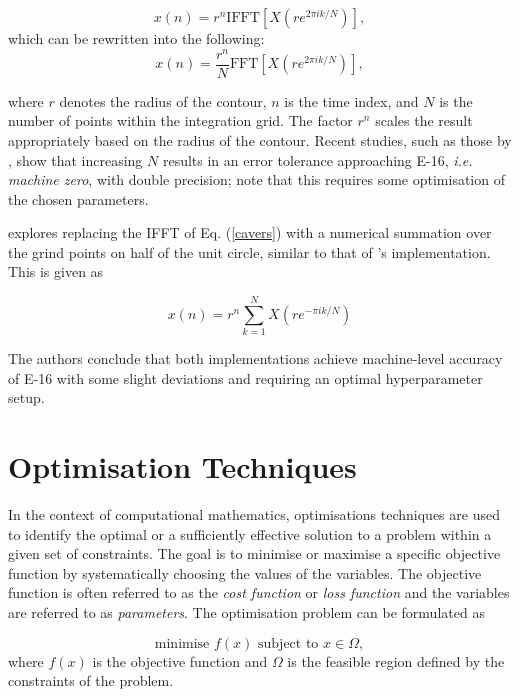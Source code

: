 \documentclass[a4paper]{report}
\begin{document}
\begin{equation}\label{cavers}
	x(n) = r^n \text{IFFT}[X(re^{2\pi ik / N})],
\end{equation}
which can be rewritten into the following:
\begin{equation}
		x(n) = \frac{r^n}{N} \text{FFT}[X(re^{2\pi ik / N})],
\end{equation}

where $r$ denotes the radius of the contour, $n$ is the time index, and $N$ is the number of points within the integration grid. The factor $r^n$ scales the result appropriately based on the radius of the contour. Recent studies, such as those by \citet{loveless2021guido}, show that increasing \(N\) results in an error tolerance approaching E-16, \textit{i.e. machine zero}, with double precision; note that this requires some optimisation of the chosen parameters. 

\citet{loveless2023phelanguido} explores replacing the IFFT of Eq. (\ref{cavers}) with a numerical summation over the grind points on half of the unit circle, similar to that of \citet{AbateWhitt1992a, AbateWhitt1992b}'s implementation. This is given as

\begin{equation}\label{equation:cavers_sum}
	x(n) = r^n \sum^{N}_{k = 1} X(re^{-\pi ik/N})
\end{equation}

The authors conclude that both implementations achieve machine-level accuracy of E-16 with some slight deviations and requiring an optimal hyperparameter setup.

\section{Optimisation Techniques}\label{section:optimisation_techniques}
In the context of computational mathematics, optimisations techniques are used to identify the optimal or a sufficiently effective solution to a problem within a given set of constraints. The goal is to minimise or maximise a specific objective function by systematically choosing the values of the variables. The objective function is often referred to as the \textit{cost function} or \textit{loss function} and the variables are referred to as \textit{parameters}. The optimisation problem can be formulated as

\begin{equation}\label{optimisation_problem}
	\text{minimise } f(x) \text{ subject to } x \in \Omega,
\end{equation}
where $f(x)$ is the objective function and $\Omega$ is the feasible region defined by the constraints of the problem.
\end{document}
